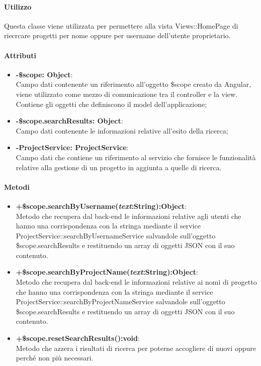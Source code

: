 	\paragraph{Utilizzo}
	Questa classe viene utilizzata per permettere alla vista Views::HomePage di riecrcare progetti per nome oppure per username dell'utente proprietario.\\
	\paragraph{Attributi}
	\begin{itemize}
		\item \textbf{-\$scope: Object}:\\
			Campo dati contenente un riferimento all'oggetto \$scope creato da Angular, viene utilizzato come mezzo di comunicazione tra il controller e la view. Contiene gli oggetti che definiscono il model dell'applicazione;	
		\item \textbf{-\$scope.searchResults: Object}:\\
			Campo dati contenente le informazioni relative all'esito della ricerca;
		\item \textbf{-ProjectService: ProjectService}:\\
			Campo dati che contiene un riferimento al servizio che fornisce le funzionalità relative alla gestione di un progetto in aggiunta a quelle di ricerca.
	
	\end{itemize}
	
	\paragraph{Metodi}
	\begin{itemize}
	  \item \textbf{+\$scope.searchByUsername(\textit{text}:String):Object}:\\
		 Metodo che recupera dal back-end le informazioni relative agli utenti che hanno una corrispondenza con la stringa mediante il service ProjectService::searchByUsernameService salvandole sull'oggetto \$scope.searchResults e restituendo un array di oggetti JSON con il suo contenuto.
	 \item \textbf{+\$scope.searchByProjectName(\textit{text}:String):Object}:\\
		Metodo che recupera dal back-end le informazioni relative ai nomi di progetto che hanno una corrispondenza con la stringa mediante il service ProjectService::searchByProjectNameService salvandole sull'oggetto \$scope.searchResults e restituendo un array di oggetti JSON con il suo contenuto.
	\item \textbf{+\$scope.resetSearchResults():void}:\\
		Metodo che azzera i risultati di ricerca per poterne accogliere di nuovi oppure perché non più necessari.
		
	\end{itemize}
